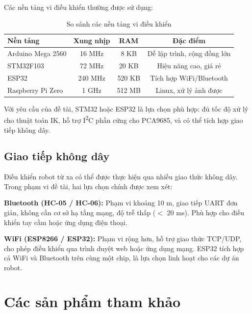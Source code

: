         Các nền tảng vi điều khiển thường được sử dụng:

        \begin{table}[h!]
        \centering
        \caption{So sánh các nền tảng vi điều khiển}
        \label{tab:mcu_compare}
        \begin{tabular}{|l|c|c|c|}
        \hline
        \textbf{Nền tảng} & \textbf{Xung nhịp} & \textbf{RAM} & \textbf{Đặc điểm} \\
        \hline
        Arduino Mega 2560 & 16 MHz  & 8 KB   & Dễ lập trình, cộng đồng lớn \\
        STM32F103         & 72 MHz  & 20 KB  & Hiệu năng cao, giá rẻ \\
        ESP32             & 240 MHz & 520 KB & Tích hợp WiFi/Bluetooth \\
        Raspberry Pi Zero & 1 GHz   & 512 MB & Linux, xử lý ảnh được \\
        \hline
        \end{tabular}
        \end{table}

        Với yêu cầu của đề tài, STM32 hoặc ESP32 là lựa chọn phù hợp: đủ tốc độ xử lý cho thuật toán IK, hỗ trợ I\textsuperscript{2}C phần cứng cho PCA9685, và có thể tích hợp giao tiếp không dây.

        \subsection{Giao tiếp không dây}

        \hspace{0.5cm} Điều khiển robot từ xa có thể được thực hiện qua nhiều giao thức không dây. Trong phạm vi đề tài, hai lựa chọn chính được xem xét:

        \textbf{Bluetooth (HC-05 / HC-06):} Phạm vi khoảng 10 m, giao tiếp UART đơn giản, không cần cơ sở hạ tầng mạng, độ trễ thấp ($<$ 20 ms). Phù hợp cho điều khiển tay cầm hoặc ứng dụng điện thoại.

        \textbf{WiFi (ESP8266 / ESP32):} Phạm vi rộng hơn, hỗ trợ giao thức TCP/UDP, cho phép điều khiển qua trình duyệt web hoặc ứng dụng mạng. ESP32 tích hợp cả WiFi và Bluetooth trên cùng một chip, là lựa chọn linh hoạt cho các dự án robot.
   
    \section{Các sản phẩm tham khảo}

